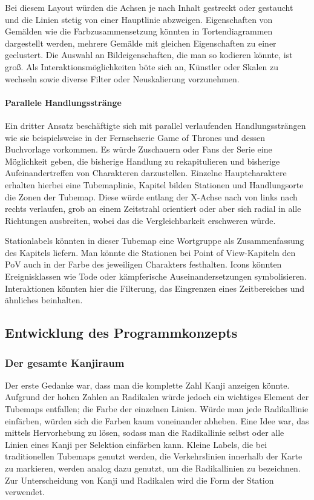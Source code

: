 Bei diesem Layout würden die Achsen je nach Inhalt gestreckt oder gestaucht und die Linien stetig von einer Hauptlinie abzweigen. Eigenschaften von Gemälden wie die Farbzusammensetzung könnten in Tortendiagrammen dargestellt werden, mehrere Gemälde mit gleichen Eigenschaften zu einer geclustert. Die Auswahl an Bildeigenschaften, die man so kodieren könnte, ist groß. Als Interaktionsmöglichkeiten böte sich an, Künstler oder Skalen zu wechseln sowie diverse Filter oder Neuskalierung vorzunehmen. 

\paragraph{Parallele Handlungsstränge}
Ein dritter Ansatz beschäftigte sich mit parallel verlaufenden Handlungssträngen wie sie beispielsweise in der Fernsehserie Game of Thrones und dessen Buchvorlage vorkommen. Es würde Zuschauern oder Fans der Serie eine Möglichkeit geben, die bisherige Handlung zu rekapitulieren und bisherige Aufeinandertreffen von Charakteren darzustellen. Einzelne Hauptcharaktere erhalten hierbei eine Tubemaplinie, Kapitel bilden Stationen und Handlungsorte die Zonen der Tubemap. Diese würde entlang der X-Achse nach von links nach rechts verlaufen, grob an einem Zeitstrahl orientiert oder aber sich radial in alle Richtungen ausbreiten, wobei das die Vergleichbarkeit erschweren würde.

Stationlabels könnten in dieser Tubemap eine Wortgruppe als Zusammenfassung des Kapitels liefern. Man könnte die Stationen bei Point of View-Kapiteln den PoV auch in der Farbe des jeweiligen Charakters festhalten. Icons könnten Ereignisklassen wie Tode oder kämpferische Auseinandersetzungen symbolisieren. Interaktionen könnten hier die Filterung, das Eingrenzen eines Zeitbereiches und ähnliches beinhalten. 


\subsection{Entwicklung des Programmkonzepts}
\subsubsection{Der gesamte Kanjiraum}
Der erste Gedanke war, dass man die komplette Zahl Kanji anzeigen könnte. Aufgrund der hohen Zahlen an Radikalen würde jedoch ein wichtiges Element der Tubemaps entfallen; die Farbe der einzelnen Linien. Würde man jede Radikallinie einfärben, würden sich die Farben kaum voneinander abheben. Eine Idee war, das mittels Hervorhebung zu lösen, sodass man die Radikallinie selbst oder alle Linien eines Kanji per Selektion einfärben kann. Kleine Labels, die bei traditionellen Tubemaps genutzt werden, die Verkehrslinien innerhalb der Karte zu markieren, werden analog dazu genutzt, um die Radikallinien zu bezeichnen. Zur Unterscheidung von Kanji und Radikalen wird die Form der Station verwendet.


